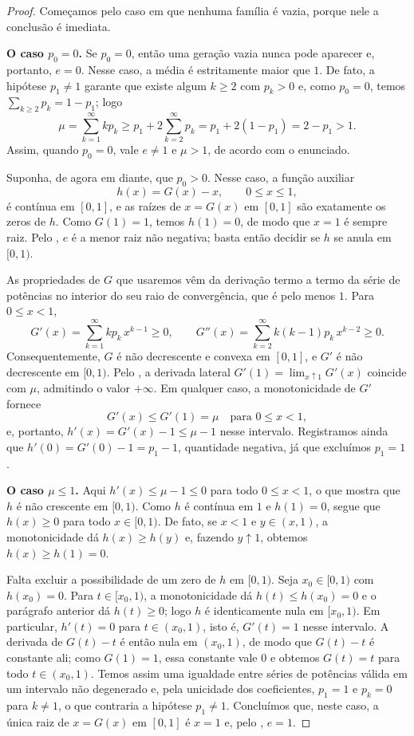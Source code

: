 \documentclass[12pt,portuguese]{article}
\theoremstyle{definition}
\theoremstyle{plainexercise}
\theoremstyle{starredexercise}
\theoremstyle{definition}
\begin{document}
\begin{proof}
Começamos pelo caso em que nenhuma família é vazia, porque nele a conclusão é
imediata.

\smallskip
\noindent\textbf{O caso $p_0=0$.}
Se $p_0=0$, então uma geração vazia nunca pode aparecer e, portanto, $e=0$.
Nesse caso, a média é estritamente maior que $1$. De fato, a hipótese
$p_1\neq1$ garante que existe algum $k\geqslant2$ com $p_k>0$ e, como $p_0=0$,
temos $\sum_{k\geqslant2}p_k=1-p_1$; logo
\[
\mu
=\sum_{k=1}^{\infty}kp_k
\geqslant p_1+2\sum_{k=2}^{\infty}p_k
=p_1+2(1-p_1)
=2-p_1
>1.
\]
Assim, quando $p_0=0$, vale $e\neq1$ e $\mu>1$, de acordo com o enunciado.

Suponha, de agora em diante, que $p_0>0$. Nesse caso, a função auxiliar
\[
h(x)=G(x)-x,\qquad 0\leqslant x\leqslant1,
\]
é contínua em $[0,1]$, e as raízes de $x=G(x)$ em $[0,1]$ são exatamente os
zeros de $h$. Como $G(1)=1$, temos $h(1)=0$, de modo que $x=1$ é sempre raiz.
Pelo , $e$ é a menor raiz não negativa; basta então
decidir se $h$ se anula em $[0,1)$.

As propriedades de $G$ que usaremos vêm da derivação termo a termo da série de
potências no interior do seu raio de convergência, que é pelo menos $1$. Para
$0\leqslant x<1$,
\[
G'(x)=\sum_{k=1}^{\infty}kp_k\,x^{k-1}\geqslant0,
\qquad
G''(x)=\sum_{k=2}^{\infty}k(k-1)p_k\,x^{k-2}\geqslant0.
\]
Consequentemente, $G$ é não decrescente e convexa em $[0,1]$, e $G'$ é não
decrescente em $[0,1)$. Pelo , a derivada lateral
$G'(1)=\lim_{x\uparrow1}G'(x)$ coincide com $\mu$, admitindo o valor $+\infty$.
Em qualquer caso, a monotonicidade de $G'$ fornece
\[
G'(x)\leqslant G'(1)=\mu
\quad\text{para } 0\leqslant x<1,
\]
e, portanto, $h'(x)=G'(x)-1\leqslant\mu-1$ nesse intervalo. Registramos ainda
que $h'(0)=G'(0)-1=p_1-1$, quantidade negativa, já que excluímos $p_1=1$.

\smallskip
\noindent\textbf{O caso $\mu\leqslant1$.}
Aqui $h'(x)\leqslant\mu-1\leqslant0$ para todo $0\leqslant x<1$, o que mostra
que $h$ é não crescente em $[0,1)$. Como $h$ é contínua em $1$ e $h(1)=0$,
segue que $h(x)\geqslant0$ para todo $x\in[0,1)$. De fato, se $x<1$ e $y\in(x,1)$,
a monotonicidade dá $h(x)\geqslant h(y)$ e, fazendo $y\uparrow1$, obtemos
$h(x)\geqslant h(1)=0$.

Falta excluir a possibilidade de um zero de $h$ em $[0,1)$. Seja
$x_0\in[0,1)$ com $h(x_0)=0$. Para $t\in[x_0,1)$, a monotonicidade dá
$h(t)\leqslant h(x_0)=0$ e o parágrafo anterior dá $h(t)\geqslant0$; logo $h$ é
identicamente nula em $[x_0,1)$. Em particular, $h'(t)=0$ para
$t\in(x_0,1)$, isto é, $G'(t)=1$ nesse intervalo. A derivada de $G(t)-t$ é
então nula em $(x_0,1)$, de modo que $G(t)-t$ é constante ali; como $G(1)=1$,
essa constante vale $0$ e obtemos $G(t)=t$ para todo $t\in(x_0,1)$. Temos
assim uma igualdade entre séries de potências válida em um intervalo não
degenerado e, pela unicidade dos coeficientes, $p_1=1$ e $p_k=0$ para
$k\neq1$, o que contraria a hipótese $p_1\neq1$. Concluímos que, neste caso, a
única raiz de $x=G(x)$ em $[0,1]$ é $x=1$ e, pelo ,
$e=1$.


\end{proof}
\end{document}
